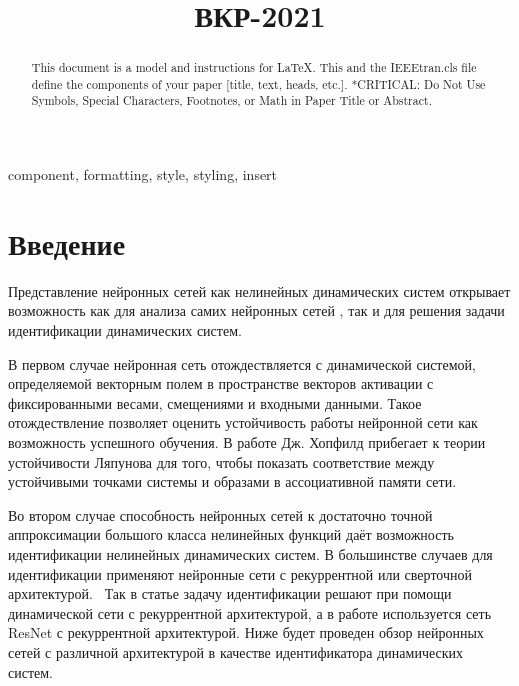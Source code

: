 \documentclass[conference]{IEEEtran}
\begin{document}
\title{ВКР-2021}


\maketitle

\begin{abstract}
This document is a model and instructions for \LaTeX.
This and the IEEEtran.cls file define the components of your paper [title, text, heads, etc.]. *CRITICAL: Do Not Use Symbols, Special Characters, Footnotes, 
or Math in Paper Title or Abstract.
\end{abstract}

\begin{IEEEkeywords}
component, formatting, style, styling, insert
\end{IEEEkeywords}

\section{Введение}
Представление нейронных сетей как нелинейных динамических систем\cite{Haykin_1998} открывает возможность как для анализа самих нейронных сетей \cite{Hopfield_1984}\cite{Hirsch_1989}, так и для решения задачи идентификации динамических систем\cite{Rovithakis_1994}. 

В первом случае нейронная сеть отождествляется с динамической системой, определяемой векторным полем в пространстве векторов активации с фиксированными весами, смещениями и входными данными\cite{Hirsch_1989}. Такое отождествление позволяет оценить устойчивость работы нейронной сети как возможность успешного обучения. В работе\cite{Hopfield_1984}  Дж. Хопфилд прибегает к теории устойчивости Ляпунова для того, чтобы показать соответствие между устойчивыми точками системы и образами в ассоциативной памяти сети\cite{Haykin_1998}. 

Во втором случае способность нейронных сетей к достаточно точной аппроксимации большого класса нелинейных функций даёт возможность идентификации нелинейных динамических систем\cite{Narendra_1990}. В большинстве случаев для идентификации применяют нейронные сети с рекуррентной или сверточной архитектурой.  Так в статье\cite{Poznyak_0002} задачу идентификации решают при помощи динамической сети с рекуррентной архитектурой, а в работе\cite{Chashchin_2019} используется сеть ResNet с рекуррентной архитектурой. Ниже будет проведен обзор нейронных сетей с различной архитектурой в качестве идентификатора динамических систем. 
\end{document}
